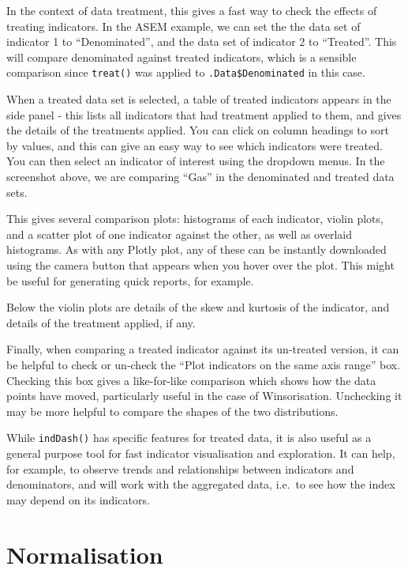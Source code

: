 \documentclass[
]{book}
\begin{document}
In the context of data treatment, this gives a fast way to check the effects of treating indicators. In the ASEM example, we can set the the data set of indicator 1 to ``Denominated'', and the data set of indicator 2 to ``Treated''. This will compare denominated against treated indicators, which is a sensible comparison since \texttt{treat()} was applied to \texttt{.Data\$Denominated} in this case.

When a treated data set is selected, a table of treated indicators appears in the side panel - this lists all indicators that had treatment applied to them, and gives the details of the treatments applied. You can click on column headings to sort by values, and this can give an easy way to see which indicators were treated. You can then select an indicator of interest using the dropdown menus. In the screenshot above, we are comparing ``Gas'' in the denominated and treated data sets.

This gives several comparison plots: histograms of each indicator, violin plots, and a scatter plot of one indicator against the other, as well as overlaid histograms. As with any Plotly plot, any of these can be instantly downloaded using the camera button that appears when you hover over the plot. This might be useful for generating quick reports, for example.

Below the violin plots are details of the skew and kurtosis of the indicator, and details of the treatment applied, if any.

Finally, when comparing a treated indicator against its un-treated version, it can be helpful to check or un-check the ``Plot indicators on the same axis range'' box. Checking this box gives a like-for-like comparison which shows how the data points have moved, particularly useful in the case of Winsorisation. Unchecking it may be more helpful to compare the shapes of the two distributions.

While \texttt{indDash()} has specific features for treated data, it is also useful as a general purpose tool for fast indicator visualisation and exploration. It can help, for example, to observe trends and relationships between indicators and denominators, and will work with the aggregated data, i.e.~to see how the index may depend on its indicators.

\hypertarget{normalisation}{%
\chapter{Normalisation}\label{normalisation}}
\end{document}
